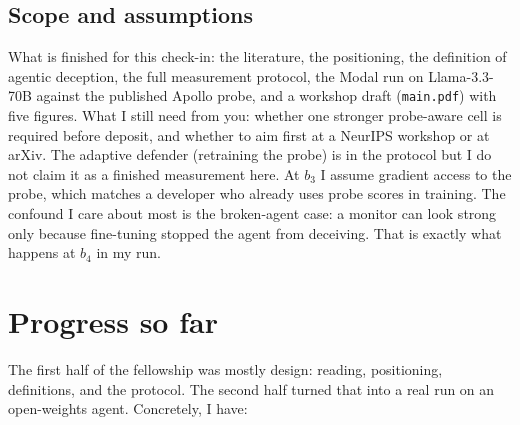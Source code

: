 \documentclass{webofc}
\begin{document}
\subsection{Scope and assumptions}
\label{sec-scope}

What is finished for this check-in: the literature, the positioning, the
definition of agentic deception, the full measurement protocol, the Modal run
on Llama-3.3-70B against the published Apollo probe, and a workshop draft
(\texttt{main.pdf}) with five figures. What I still need from you: whether one
stronger probe-aware cell is required before deposit, and whether to aim first
at a NeurIPS workshop or at arXiv. The adaptive defender (retraining the probe)
is in the protocol but I do not claim it as a finished measurement here. At
$b_3$ I assume gradient access to the probe, which matches a developer who
already uses probe scores in training. The confound I care about most is the
broken-agent case: a monitor can look strong only because fine-tuning stopped
the agent from deceiving. That is exactly what happens at $b_4$ in my run.

\section{Progress so far}
\label{sec-progress}

The first half of the fellowship was mostly design: reading, positioning,
definitions, and the protocol. The second half turned that into a real run on
an open-weights agent. Concretely, I have:
\end{document}

